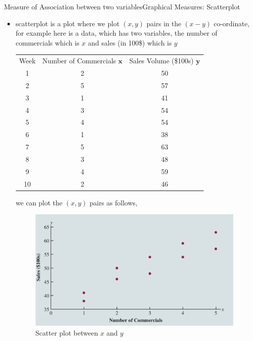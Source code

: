 \documentclass[8pt, usepdftitle=false]{beamer}
\begin{document}
\begin{frame}[allowframebreaks]{Measure of Association between two variables}{Graphical Measures: Scatterplot}
  
\begin{itemize}

\item scatterplot is a plot where we plot $(x,y)$ pairs in the $(x-y)$ co-ordinate, for example here is a data, which has two variables, the number of commercials which is $x$ and sales (in 100\$) which is $y$


\begin{table}[H]
\centering
  \begin{tabular}{c|c|c} 
Week & Number of Commercials $\boldsymbol{x}$ & Sales Volume (\$100s) $\boldsymbol{y}$ \\
1 & 2 & 50 \\
2 & 5 & 57 \\
3 & 1 & 41 \\
4 & 3 & 54 \\
5 & 4 & 54 \\
6 & 1 & 38 \\
7 & 5 & 63 \\
8 & 3 & 48 \\
9 & 4 & 59 \\
10 & 2 & 46
\end{tabular}
\end{table}

we can plot the $(x, y)$ pairs as follows, 

\framebreak

\begin{figure}[H]
\centering
\includegraphics[scale = .25]{Images/scatter_plots.png}
\caption{Scatter plot between $x$ and $y$}
\end{figure}


\end{itemize}
\end{frame}
\end{document}
